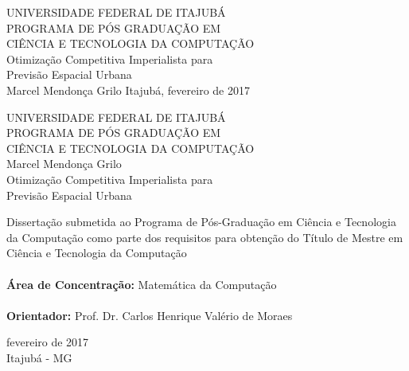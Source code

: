     \begin{center}
        {\normalsize UNIVERSIDADE FEDERAL DE ITAJUBÁ} \\[0.5cm]
        {\normalsize PROGRAMA DE PÓS GRADUAÇÃO EM} \\
        {\normalsize CIÊNCIA E TECNOLOGIA DA COMPUTAÇÃO} \\[7.0cm]
        {\Large Otimização Competitiva Imperialista para \\ Previsão Espacial Urbana} \\[4.0cm]
        {\large Marcel Mendonça Grilo}
        \vfill
        {\normalsize Itajubá, fevereiro de 2017}
    \end{center}
\cleardoublepage
    \begin{center}
        {\normalsize UNIVERSIDADE FEDERAL DE ITAJUBÁ} \\
        {\normalsize PROGRAMA DE PÓS GRADUAÇÃO EM} \\
        {\normalsize CIÊNCIA E TECNOLOGIA DA COMPUTAÇÃO} \\[3.3cm]
        {\large Marcel Mendonça Grilo} \\[3.3cm]
        {\Large Otimização Competitiva Imperialista para \\ Previsão Espacial Urbana} \\[5.0cm]
        \begin{flushright}
        \begin{minipage}{.70\textwidth}
                Dissertação submetida ao Programa de Pós-Graduação em Ciência e Tecnologia 
                da Computação como parte dos requisitos para obtenção do Título de 
                Mestre em Ciência e Tecnologia da Computação \\ \\
                \textbf{Área de Concentração:}  Matemática da Computação \\ \\
                \textbf{Orientador:} Prof. Dr. Carlos Henrique Valério de Moraes \\
        \end{minipage}
        \end{flushright}
        \vfill
        {\normalsize fevereiro de 2017} \\
        {\normalsize Itajubá - MG}
    \end{center}
    \cleardoublepage